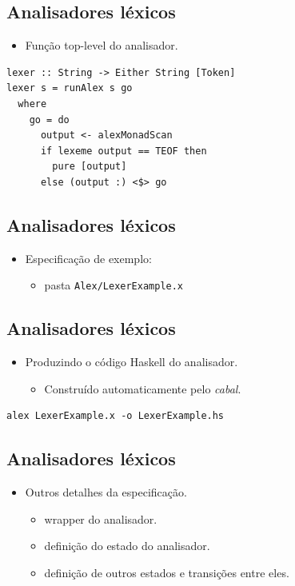 \documentclass[11pt]{article}
\begin{document}
\subsection*{Analisadores léxicos}
\label{sec:org067e3c6}

\begin{itemize}
\item Função top-level do analisador.
\end{itemize}

\begin{verbatim}
lexer :: String -> Either String [Token]
lexer s = runAlex s go
  where
    go = do
      output <- alexMonadScan
      if lexeme output == TEOF then
        pure [output]
      else (output :) <$> go
\end{verbatim}
\subsection*{Analisadores léxicos}
\label{sec:orgdcd8a59}

\begin{itemize}
\item Especificação de exemplo:
\begin{itemize}
\item pasta \texttt{Alex/LexerExample.x}
\end{itemize}
\end{itemize}
\subsection*{Analisadores léxicos}
\label{sec:orgfa9c21e}

\begin{itemize}
\item Produzindo o código Haskell do analisador.
\begin{itemize}
\item Construído automaticamente pelo \emph{cabal}.
\end{itemize}
\end{itemize}

\begin{verbatim}
alex LexerExample.x -o LexerExample.hs
\end{verbatim}
\subsection*{Analisadores léxicos}
\label{sec:org8fe7db9}

\begin{itemize}
\item Outros detalhes da especificação.
\begin{itemize}
\item wrapper do analisador.
\item definição do estado do analisador.
\item definição de outros estados e transições entre eles.
\end{itemize}
\end{itemize}
\end{document}

